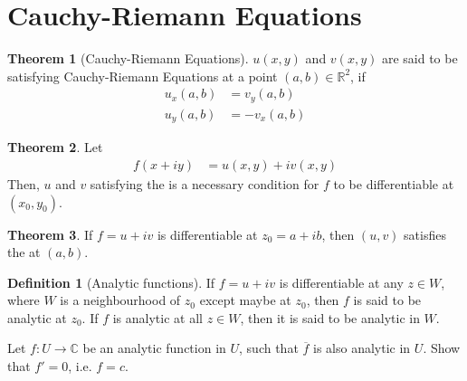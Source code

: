 \documentclass[titlepage, fleqn, a4paper, 12pt, twoside]{article}
\theoremstyle{definition}
\newtheorem{definition}{Definition}
\theoremstyle{theorem}
\newtheorem{theorem}{Theorem}
\begin{document}
\section{Cauchy-Riemann Equations}

\begin{theorem}[Cauchy-Riemann Equations]
	$u(x,y)$ and $v(x,y)$ are said to be satisfying Cauchy-Riemann Equations at a point $(a,b) \in \mathbb{R}^2$, if
	\begin{align*}
		u_x(a,b) & = v_y(a,b) \\
		u_y(a,b) & = -v_x(a,b)
	\end{align*}
	\label{Cauchy-Riemann_Equations}
\end{theorem}

\begin{theorem}
	Let
	\begin{align*}
		f(x + i y) & = u(x,y) + i v(x,y)
	\end{align*}
	Then, $u$ and $v$ satisfying the  is a necessary condition for $f$ to be differentiable at $(x_0,y_0)$.
\end{theorem}

\begin{theorem}
	If $f = u + i v$ is differentiable at $z_0 = a + i b$, then $(u,v)$ satisfies the  at $(a,b)$.
\end{theorem}

\begin{definition}[Analytic functions]
	If $f = u + i v$ is differentiable at any $z \in W$, where $W$ is a neighbourhood of $z_0$ except maybe at $z_0$, then $f$ is said to be analytic at $z_0$.
	If $f$ is analytic at all $z \in W$, then it is said to be analytic in $W$.
\end{definition}

\begin{question}
	Let $f : U \to \mathbb{C}$ be an analytic function in $U$, such that $\overline{f}$ is also analytic in $U$.
	Show that $f' = 0$, i.e. $f = c$.
\end{question}
\end{document}
